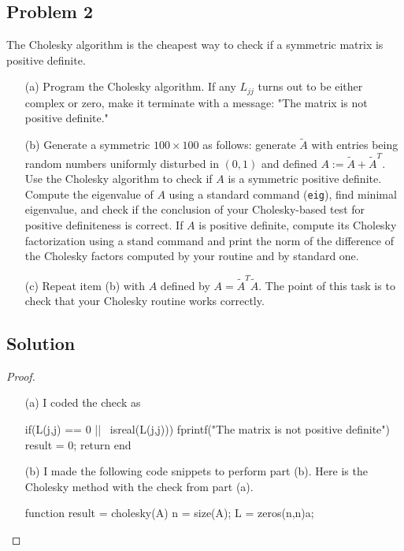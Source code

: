 \documentclass[12pt]{report}
\begin{document}
\begin{problem}%
\subsection*{Problem 2}

The Cholesky algorithm is the cheapest way to check if a symmetric matrix is positive deﬁnite.

\begin{enumerate}
    \item [(a)] Program the Cholesky algorithm. If any $L_{jj}$ turns out to be either complex or zero, make it terminate with a message: "The matrix is not positive definite."
    \item [(b)] Generate a symmetric $100 \times 100$ as follows: generate $\tilde{A}$ with entries being random numbers uniformly disturbed in $(0,1)$ and defined $A := \tilde{A} + \tilde{A}^T$. Use the Cholesky algorithm to check if $A$ is a symmetric positive definite. Compute the eigenvalue of $A$ using a standard command (\verb+eig+), find minimal eigenvalue, and check if the conclusion of your Cholesky-based test for positive definiteness is correct. If $A$ is positive definite, compute its Cholesky factorization using a stand command and print the norm of the difference of the Cholesky factors computed by your routine and by standard one.
    \item [(c)] Repeat item (b) with $A$ defined by $A = \tilde{A}^T\tilde{A}$. The point of this task is to check that your Cholesky routine works correctly. 
\end{enumerate}

\subsection*{Solution}
\begin{proof}

\begin{enumerate}
    \item [(a)]
    I coded the check as
    \begin{python}
    if(L(j,j) == 0 || ~isreal(L(j,j)))
        fprintf("The matrix is not positive definite")
        result = 0;
        return 
    end
    \end{python}

    \item [(b)]
    I made the following code snippets to perform part (b). Here is the Cholesky method with the check from part (a).
    \begin{python}
    function result = cholesky(A)
        n = size(A);
        L = zeros(n,n)a;
    

\end{python}
\end{enumerate}
\end{proof}
\end{problem}
\end{document}
